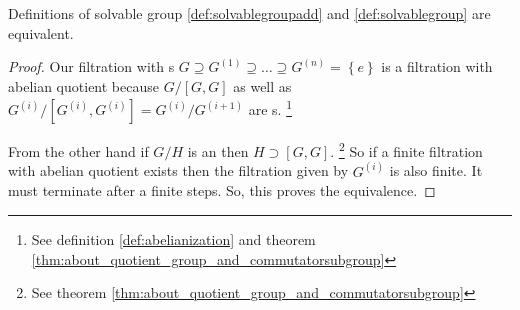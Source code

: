 \begin{remark}
  Definitions of solvable group \ref{def:solvablegroupadd} and
  \ref{def:solvablegroup} are equivalent.
  \begin{proof}
    Our filtration with s
    $G \supseteq G^{(1)} \supseteq \dots \supseteq G^{(n)} =
    \left\{e\right\}$
    is a filtration with abelian quotient because
    $G/\left[G, G\right]$ as well as 
    $G^{(i)}/\left[G^{(i)}, G^{(i)}\right] = G^{(i)}/G^{(i+1)}$ are
    s.
    \footnote{
      See definition \ref{def:abelianization} and theorem
      \ref{thm:about_quotient_group_and_commutatorsubgroup}
    }

    From the other hand if $G/H$ is an  then
    $H \supset \left[G, G\right]$.
    \footnote{
      See theorem \ref{thm:about_quotient_group_and_commutatorsubgroup}
    }
    So if a finite filtration with
    abelian quotient exists then the filtration given by $G^{(i)}$ is
    also finite. It must terminate after a finite steps. So, this
    proves the equivalence.  
  \end{proof}
  \label{rem:lec8_solvable}
\end{remark}

